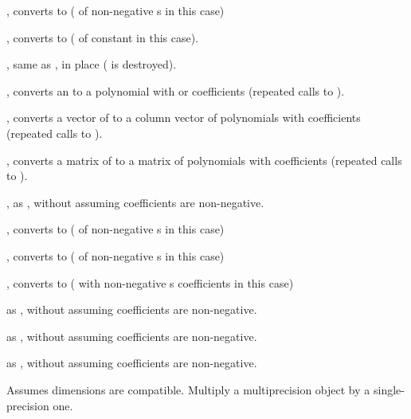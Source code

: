 
, converts to  ( of non-negative
s in this case)

, converts to  ( of constant
 in this case).

, same as , in place
( is destroyed).

, converts an  to a polynomial with
 or  coefficients (repeated calls to ).

, converts a vector of  to a column
vector of polynomials with  coefficients (repeated calls to
).

, converts a matrix of  to a matrix of
polynomials with  coefficients (repeated calls to ).

, as , without assuming
coefficients are non-negative.

, converts to  ( of non-negative
s in this case)

, converts to  ( of non-negative
s in this case)

, converts to  ( with
non-negative s coefficients in this case)

 as , without assuming
coefficients are non-negative.

 as , without assuming
coefficients are non-negative.

 as , without assuming
coefficients are non-negative.

 Assumes dimensions are compatible.
Multiply a multiprecision object by a single-precision one.






